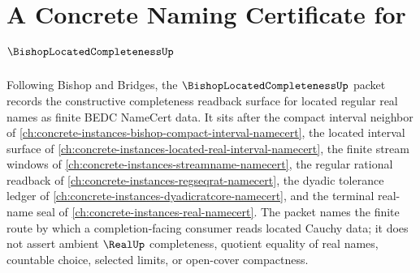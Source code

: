 \chapter{A Concrete Naming Certificate for $\BishopLocatedCompletenessUp$}
\label{ch:concrete-instances-bishop-located-completeness-namecert}

Following Bishop and Bridges, the $\BishopLocatedCompletenessUp$ packet records the constructive completeness readback surface for located regular real names as finite BEDC NameCert data. It sits after the compact interval neighbor of \autoref{ch:concrete-instances-bishop-compact-interval-namecert}, the located interval surface of \autoref{ch:concrete-instances-located-real-interval-namecert}, the finite stream windows of \autoref{ch:concrete-instances-streamname-namecert}, the regular rational readback of \autoref{ch:concrete-instances-regseqrat-namecert}, the dyadic tolerance ledger of \autoref{ch:concrete-instances-dyadicratcore-namecert}, and the terminal real-name seal of \autoref{ch:concrete-instances-real-namecert}. The packet names the finite route by which a completion-facing consumer reads located Cauchy data; it does not assert ambient $\RealUp$ completeness, quotient equality of real names, countable choice, selected limits, or open-cover compactness.

